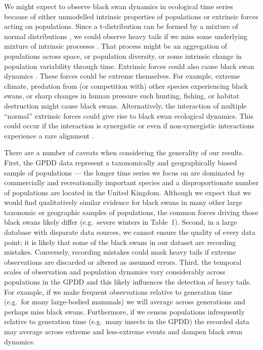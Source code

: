 We might expect to observe black swan dynamics in ecological time series
because of either unmodelled intrinsic properties of populations or extrinsic
forces acting on populations. Since a t-distribution can be formed by a mixture
of normal distributions \citep{gelman2014}, we could observe heavy tails if we
miss some underlying mixture of intrinsic processes \citep{allen2001}. That
process might be an aggregation of populations across space, or population
diversity, or some intrinsic change in population variability through time.
Extrinsic forces could also cause black swan dynamics
\citep[e.g.][]{nunez2012}. These forces could be extreme themselves. For
example, extreme climate, predation from (or competition with) other species
experiencing black swans, or sharp changes in human pressure such hunting,
fishing, or habitat destruction might cause black swans. Alternatively, the
interaction of multiple ``normal'' extrinsic forces could give rise to black
swan ecological dynamics. This could occur if the interaction is synergistic
\citep[e.g.][]{kirby2009} or even if non-synergistic interactions experience
a rare alignment \citep{denny2009}.

There are a number of caveats when considering the generality of our results.
First, the GPDD data represent a taxonomically and geographically biased sample
of populations --- the longer time series we focus on are dominated by
commercially and recreationally important species and a disproportionate number
of populations are located in the United Kingdom. Although we expect that we
would find qualitatively similar evidence for black swans in many other large
taxonomic or geographic samples of populations, the common forces driving those
black swans likely differ (e.g.~severe winters in Table~1). Second, in a large
database with disparate data sources, we cannot ensure the quality of every
data point; it is likely that some of the black swans in our dataset are
recording mistakes. Conversely, recording mistakes could mask heavy tails if
extreme observations are discarded or altered as assumed errors. Third, the
temporal scales of observation and population dynamics vary considerably across
populations in the GPDD and this likely influences the detection of heavy
tails. For example, if we make frequent observations relative to generation
time (e.g.~for many large-bodied mammals) we will average across generations
and perhaps miss black swans. Furthermore, if we census populations
infrequently relative to generation time (e.g.~many insects in the GPDD) the
recorded data may average across extreme and less-extreme events and dampen
black swan dynamics.

